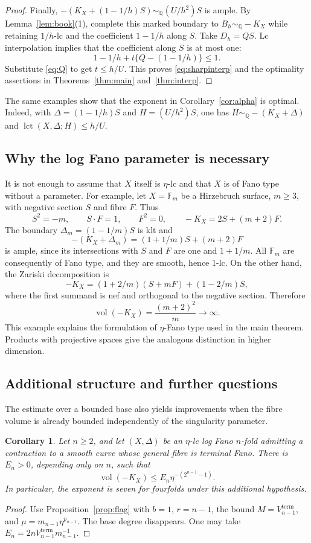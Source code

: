 \documentclass[11pt,reqno]{amsart}
\numberwithin{equation}{section}
\newtheorem{corollary}[theorem]{Corollary}
\theoremstyle{definition}
\theoremstyle{remark}
\newcommand{\Q}{\mathbb Q}
\newcommand{\simq}{\sim_{\Q}}
\newcommand{\vol}{\operatorname{vol}}
\newcommand{\lct}{\operatorname{lct}}
\begin{document}
\begin{proof}
Finally, $-(K_X+(1-1/h)S)\simq(U/h^2)S$ is ample. By Lemma~\ref{lem:book}(1), complete this marked boundary to $B_h\simq-K_X$ while retaining $1/h$-lc and the coefficient $1-1/h$ along $S$. Take $D_h=QS$. Lc interpolation implies that the coefficient along $S$ is at most one:
\[
 1-1/h+t\{Q-(1-1/h)\}\le1.
\]
Substitute \eqref{eq:Q} to get $t\le h/U$. This proves \eqref{eq:sharpinterp} and the optimality assertions in Theorems~\ref{thm:main} and~\ref{thm:interp}.
\end{proof}

The same examples show that the exponent in Corollary~\ref{cor:alpha} is optimal. Indeed, with $\Delta=(1-1/h)S$ and $H=(U/h^2)S$, one has $H\simq-(K_X+\Delta)$ and $\lct(X,\Delta;H)\le h/U$.

\subsection{Why the log Fano parameter is necessary}
It is not enough to assume that $X$ itself is $\eta$-lc and that $X$ is of Fano type without a parameter. For example, let $X=\mathbb F_m$ be a Hirzebruch surface, $m\ge3$, with negative section $S$ and fibre $F$. Thus
\[
 S^2=-m,\qquad S\cdot F=1,\qquad F^2=0,\qquad
 -K_X=2S+(m+2)F.
\]
The boundary $\Delta_m=(1-1/m)S$ is klt and
\[
 -(K_X+\Delta_m)=(1+1/m)S+(m+2)F
\]
is ample, since its intersections with $S$ and $F$ are one and $1+1/m$. All $\mathbb F_m$ are consequently of Fano type, and they are smooth, hence $1$-lc. On the other hand, the Zariski decomposition is
\[
 -K_X=(1+2/m)(S+mF)+(1-2/m)S,
\]
where the first summand is nef and orthogonal to the negative section. Therefore
\[
 \vol(-K_X)=\frac{(m+2)^2}{m}\longrightarrow\infty.
\]
This example explains the formulation of $\eta$-Fano type used in the main theorem. Products with projective spaces give the analogous distinction in higher dimension.

\subsection{Additional structure and further questions}
The estimate over a bounded base also yields improvements when the fibre volume is already bounded independently of the singularity parameter.

\begin{corollary}\label{cor:curveimproved}
Let $n\ge2$, and let $(X,\Delta)$ be an $\eta$-lc log Fano $n$-fold admitting a contraction to a smooth curve whose general fibre is terminal Fano. There is $E_n>0$, depending only on $n$, such that
\[
 \vol(-K_X)\le E_n\eta^{-(2^{n-1}-1)}.
\]
In particular, the exponent is seven for fourfolds under this additional hypothesis.
\end{corollary}
\begin{proof}
Use Proposition~\ref{prop:flag} with $b=1$, $r=n-1$, the bound $M=V_{n-1}^{\mathrm{term}}$, and $\mu=m_{n-1}\eta^{p_{n-1}}$. The base degree disappears. One may take $E_n=2nV_{n-1}^{\mathrm{term}}m_{n-1}^{-1}$.
\end{proof}
\end{document}
